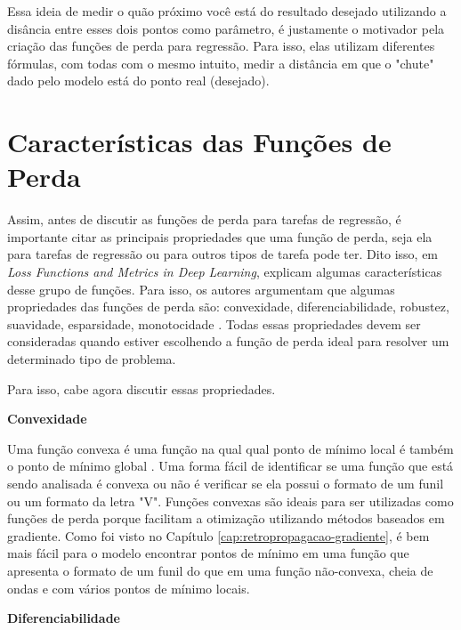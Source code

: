 Essa ideia de medir o quão próximo você está do resultado desejado utilizando a disância entre esses dois pontos como parâmetro, é justamente o motivador pela criação das funções de perda para regressão. Para isso, elas utilizam diferentes fórmulas, com todas com o mesmo intuito, medir a distância em que o "chute" dado pelo modelo está do ponto real (desejado).

\section{Características das Funções de Perda}

Assim, antes de discutir as funções de perda para tarefas de regressão, é importante citar as principais propriedades que uma função de perda, seja ela para tarefas de regressão ou para outros tipos de tarefa pode ter. Dito isso, em \textit{Loss Functions and Metrics in Deep Learning}, \textcite{LossesArticle} explicam algumas características desse grupo de funções. Para isso, os autores argumentam que algumas propriedades das funções de perda são: convexidade, diferenciabilidade, robustez, suavidade, esparsidade, monotocidade \parencite{LossesArticle}. Todas essas propriedades devem ser consideradas quando estiver escolhendo a função de perda ideal para resolver um determinado tipo de problema.

Para isso, cabe agora discutir essas propriedades.

\medskip
\textbf{Convexidade}
\medskip

Uma função convexa é uma função na qual qual ponto de mínimo local é também o ponto de mínimo global \parencite{LossesArticle}. Uma forma fácil de identificar se uma função que está sendo analisada é convexa ou não é verificar se ela possui o formato de um funil ou um formato da letra "V". Funções convexas são ideais para ser utilizadas como funções de perda porque facilitam a otimização utilizando métodos baseados em gradiente. Como foi visto no Capítulo \ref{cap:retropropagacao-gradiente}, é bem mais fácil para o modelo encontrar pontos de mínimo em uma função que apresenta o formato de um funil do que em uma função não-convexa, cheia de ondas e com vários pontos de mínimo locais.

\medskip
\textbf{Diferenciabilidade}
\medskip

